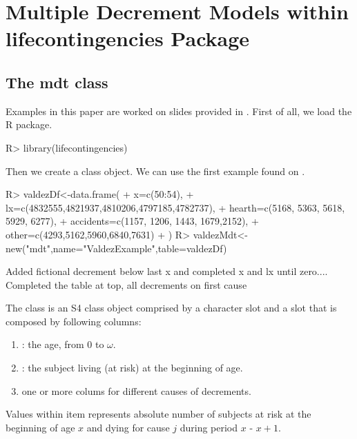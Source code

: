 \documentclass[nojss]{jss}
\begin{document}
\section{Multiple Decrement Models within lifecontingencies Package}
\subsection{The mdt class}

Examples in this paper are worked on slides provided in \cite{valdezSlides}.
First of all, we load the R package.

\begin{Schunk}
\begin{Sinput}
R> library(lifecontingencies)
\end{Sinput}
\end{Schunk}

Then  we create a  class object. We can use the first example found on
\cite[p. 4]{valdezSlide}.

\begin{Schunk}
\begin{Sinput}
R> valdezDf<-data.frame(
+  		x=c(50:54),
+  		lx=c(4832555,4821937,4810206,4797185,4782737),
+  		hearth=c(5168, 5363, 5618, 5929, 6277),
+  		accidents=c(1157, 1206, 1443, 1679,2152),
+  		other=c(4293,5162,5960,6840,7631)
+  )
R> valdezMdt<-new("mdt",name="ValdezExample",table=valdezDf)
\end{Sinput}
\begin{Soutput}
Added fictional decrement below last x and completed x and lx until zero.... 
Completed the table at top, all decrements on first cause 
\end{Soutput}
\end{Schunk}

The  class is an S4 class object \citep{chambers2008software}
comprised by a character slot  and a  slot
 that is composed by following columns:
\begin{enumerate}
  \item {}: the age, from 0 to $\omega$.
  \item {}: the subject living (at risk) at the beginning of age.
  \item one or more colums for different causes of decrements.
 \end{enumerate}
 
 Values within  item represents absolute number of subjects at risk at the beginning of age $x$ and dying for cause $j$ during period $x$ - $x+1$.\\
\end{document}
